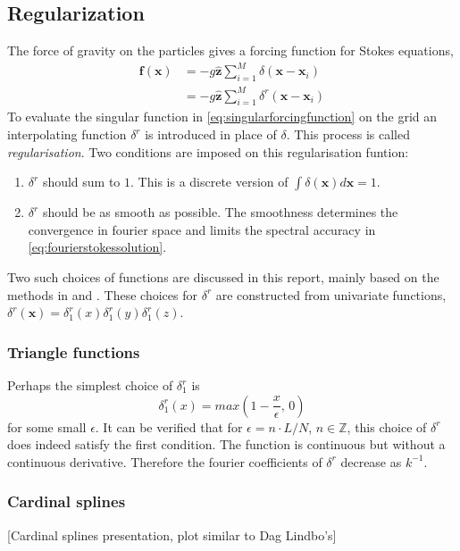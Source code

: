 \documentclass[a4paper,
twoside=false,abstract=false,numbers=noenddot,
titlepage=false,headings=small,parskip=half,version=last]{scrartcl}
\begin{document}
\subsection{Regularization}
The force of gravity on the particles gives a forcing function for Stokes equations,
\begin{align}
\mathbf{f}(\mathbf{x}) &= -g\hat{\mathbf{z}}\sum_{i=1}^M \delta (\mathbf{x}-\mathbf{x}_i)\label{eq:singularforcingfunction}\\
&= -g\hat{\mathbf{z}}\sum_{i=1}^M \delta^{r} (\mathbf{x}-\mathbf{x}_i)
\end{align}
To evaluate the singular function in \eqref{eq:singularforcingfunction} on the grid an interpolating function $\delta^{r}$ is introduced in place of $\delta$.
This process is called \emph{regularisation}.
Two conditions are imposed on this regularisation funtion:
\begin{enumerate}
\item $\delta^{r}$ should sum to $1$. This is a discrete version of $\int \delta(\mathbf{x}) d\mathbf{x}=1$.
\item $\delta^{r}$ should be as smooth as possible. The smoothness determines the convergence in fourier space and limits the spectral accuracy in \eqref{eq:fourierstokessolution}.
\end{enumerate}
Two such choices of functions are discussed in this report, mainly based on the methods in \cite{spectralewald} and \cite{interfaceregularization}.
These choices for $\delta^{r}$ are constructed from univariate functions, $\delta^{r}(\mathbf{x}) = \delta^{r}_{1}(x) \delta^{r}_{1}(y) \delta^{r}_{1}(z)$.

\subsubsection{Triangle functions}
Perhaps the simplest choice of $\delta^{r}_{1}$ is
\begin{equation}
\delta^{r}_{1}(x) = max\left(1-\frac{x}{\epsilon}\text{, }0\right)
\end{equation}
for some small $\epsilon$.
It can be verified that for $\epsilon=n\cdot L/N$, $n\in\mathbb{Z}$, this choice of $\delta^r$ does indeed satisfy the first condition.
The function is continuous but without a continuous derivative.
Therefore the fourier coefficients of $\delta^r$ decrease as $k^{-1}$.

\subsubsection{Cardinal splines}
[Cardinal splines presentation, plot similar to Dag Lindbo's]
\end{document}
